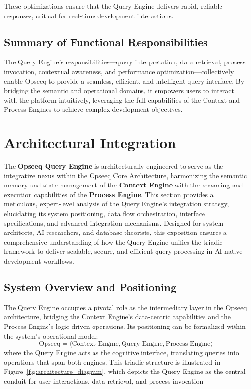 \documentclass[11pt]{article}
\begin{document}
These optimizations ensure that the Query Engine delivers rapid, reliable responses, critical for real-time development interactions.

\subsection{Summary of Functional Responsibilities}
The Query Engine’s responsibilities—query interpretation, data retrieval, process invocation, contextual awareness, and performance optimization—collectively enable Opseeq to provide a seamless, efficient, and intelligent query interface. By bridging the semantic and operational domains, it empowers users to interact with the platform intuitively, leveraging the full capabilities of the Context and Process Engines to achieve complex development objectives.



\section{Architectural Integration}
\label{sec:architecture}

The \textbf{Opseeq Query Engine} is architecturally engineered to serve as the integrative nexus within the Opseeq Core Architecture, harmonizing the semantic memory and state management of the \textbf{Context Engine} with the reasoning and execution capabilities of the \textbf{Process Engine}. This section provides a meticulous, expert-level analysis of the Query Engine’s integration strategy, elucidating its system positioning, data flow orchestration, interface specifications, and advanced integration mechanisms. Designed for system architects, AI researchers, and database theorists, this exposition ensures a comprehensive understanding of how the Query Engine unifies the triadic framework to deliver scalable, secure, and efficient query processing in AI-native development workflows.

\subsection{System Overview and Positioning}
\label{subsec:arch_overview}

The Query Engine occupies a pivotal role as the intermediary layer in the Opseeq architecture, bridging the Context Engine’s data-centric capabilities and the Process Engine’s logic-driven operations. Its positioning can be formalized within the system’s operational model:
\[
\text{Opseeq} = \langle \text{Context Engine}, \text{Query Engine}, \text{Process Engine} \rangle
\]
where the Query Engine acts as the cognitive interface, translating queries into operations that span both engines. This triadic structure is illustrated in Figure~\ref{fig:architecture_diagram}, which depicts the Query Engine as the central conduit for user interactions, data retrieval, and process invocation.
\end{document}
